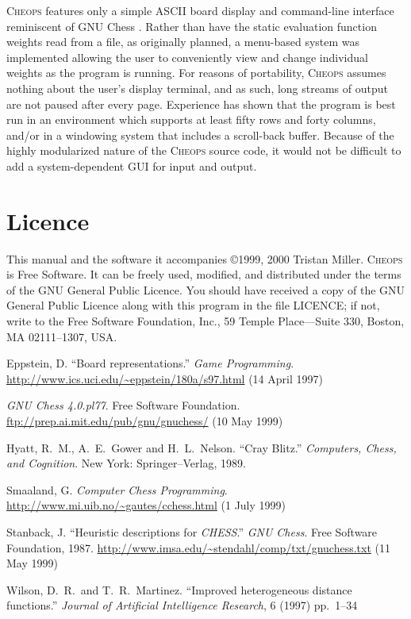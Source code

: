 \documentclass[12pt]{article}
\begin{document}
\textsc{Cheops} features only a simple ASCII board display and
command-line interface reminiscent of GNU Chess \cite{gnuchess}.
Rather than have the static evaluation function weights read from a
file, as originally planned, a menu-based system was implemented
allowing the user to conveniently view and change individual weights
as the program is running. For reasons of portability, \textsc{Cheops}
assumes nothing about the user's display terminal, and as such, long
streams of output are not paused after every page. Experience has
shown that the program is best run in an environment which supports at
least fifty rows and forty columns, and/or in a windowing system that
includes a scroll-back buffer.  Because of the highly modularized
nature of the \textsc{Cheops} source code, it would not be difficult
to add a system-dependent GUI for input and output.

\section{Licence}

This manual and the software it accompanies \copyright 1999, 2000
Tristan Miller.  \textsc{Cheops} is Free Software. It can be freely
used, modified, and distributed under the terms of the GNU General
Public Licence.  You should have received a copy of the GNU General
Public Licence along with this program in the file LICENCE; if not,
write to the Free Software Foundation, Inc., 59 Temple Place---Suite
330, Boston, MA 02111--1307, USA.

\begin{thebibliography}{99}

 Eppstein, D. ``Board representations.''
  \emph{Game Programming}.
  \url{http://www.ics.uci.edu/~eppstein/180a/s97.html}  (14 April 1997)

 \emph{GNU Chess 4.0.pl77}.  Free Software
  Foundation.  \url{ftp://prep.ai.mit.edu/pub/gnu/gnuchess/} (10 May 1999)

 Hyatt, R.~M., A.~E.~Gower and H.~L.~Nelson.
  ``Cray Blitz.'' \emph{Computers, Chess, and Cognition}.  New York:
  Springer--Verlag, 1989.

 Smaaland, G.  \emph{Computer Chess
    Programming}.  \url{http://www.mi.uib.no/~gautes/cchess.html}
  (1 July 1999)

 Stanback, J.  ``Heuristic descriptions for
  \emph{CHESS}.''  \emph{GNU Chess}.  Free Software Foundation, 1987.
  \url{http://www.imsa.edu/~stendahl/comp/txt/gnuchess.txt} (11 May 1999)

 Wilson, D.~R.~and T.~R.~Martinez. ``Improved
  heterogeneous distance functions.''  \emph{Journal of Artificial
    Intelligence Research}, 6 (1997) pp.~1--34

\end{thebibliography}
\end{document}
